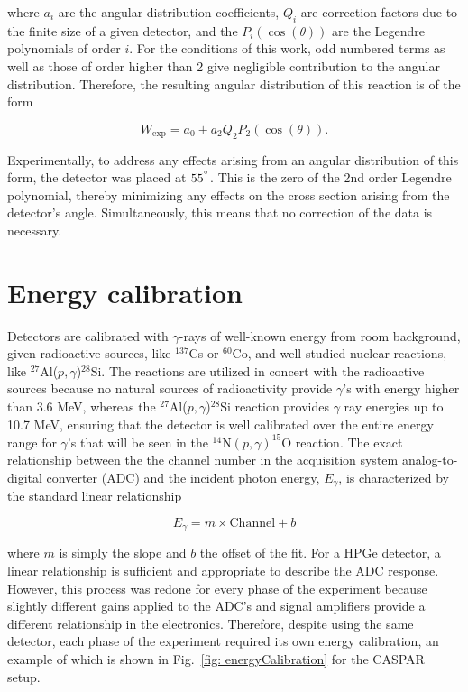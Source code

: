 \noindent where $a_{i}$ are the angular distribution coefficients, $Q_{i}$ are correction factors due to the finite size of a given detector, and the $P_{i} ( \cos (\theta) )$ are the Legendre polynomials of order $i$. For the conditions of this work, odd numbered terms as well as those of order higher than 2 give negligible contribution to the angular distribution. Therefore, the resulting angular distribution of this reaction is of the form

\begin{equation}
W_{\text{exp}} = a_{0} + a_{2} Q_{2} P_{2} ( \cos (\theta) ).
\end{equation}

Experimentally, to address any effects arising from an angular distribution of this form, the detector was placed at $55^{\degree}$. This is the zero of the 2nd order Legendre polynomial, thereby minimizing any effects on the cross section arising from the detector's angle. Simultaneously, this means that no correction of the data is necessary.


\section{Energy calibration}
\label{sec: energy calibration}

Detectors are calibrated with $\gamma$-rays of well-known energy from room background, given radioactive sources, like $^{137}$Cs or $^{60}$Co, and well-studied nuclear reactions, like $^{27}$Al($p, \gamma$)$^{28}$Si. The reactions are utilized in concert with the radioactive sources because no natural sources of radioactivity provide $\gamma$'s with energy higher than 3.6 MeV, whereas the $^{27}$Al($p, \gamma$)$^{28}$Si reaction provides $\gamma$ ray energies up to 10.7 MeV, ensuring that the detector is well calibrated over the entire energy range for $\gamma$'s that will be seen in the $^{14}$N$\left( p,\gamma \right) ^{15}$O reaction. The exact relationship between the the channel number in the acquisition system analog-to-digital converter (ADC) and the incident photon energy, $E_{\gamma}$, is characterized by the standard linear relationship

\begin{equation}
E_{\gamma} = m \times \text{Channel} + b
\end{equation}

\noindent where $m$ is simply the slope and $b$ the offset of the fit. For a HPGe detector, a linear relationship is sufficient and appropriate to describe the ADC response. However, this process was redone for every phase of the experiment because slightly different gains applied to the ADC's and signal amplifiers provide a different relationship in the electronics. Therefore, despite using the same detector, each phase of the experiment required its own energy calibration, an example of which is shown in Fig.\ \ref{fig: energyCalibration} for the CASPAR setup.


